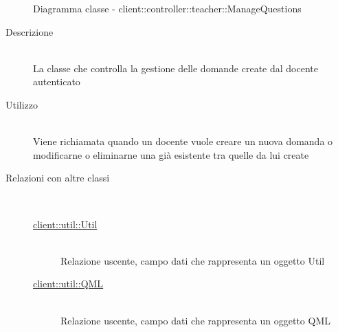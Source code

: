 \vspace{0.5cm}
\hypertarget{client::controller::teacher::ManageQuestions}{}
\begin{figure}[H]
	\centering
	\caption{Diagramma classe - client::controller::teacher::ManageQuestions}
\end{figure}\begin{description}
\item[Descrizione] \hfill \\
La classe che controlla la gestione delle domande create dal docente autenticato
\item[Utilizzo] \hfill \\
Viene richiamata quando un docente vuole creare un nuova domanda o modificarne o eliminarne una già esistente tra quelle da lui create
\item[Relazioni con altre classi] \hfill \\
\vspace{-7mm}
\begin{description}
	\item[\hyperlink{client::util::Util}{client::util::Util}] \hfill \\
	Relazione uscente, campo dati che rappresenta un oggetto Util
	\item[\hyperlink{client::util::QML}{client::util::QML}] \hfill \\
	Relazione uscente, campo dati che rappresenta un oggetto QML

\end{description}
\end{description}
